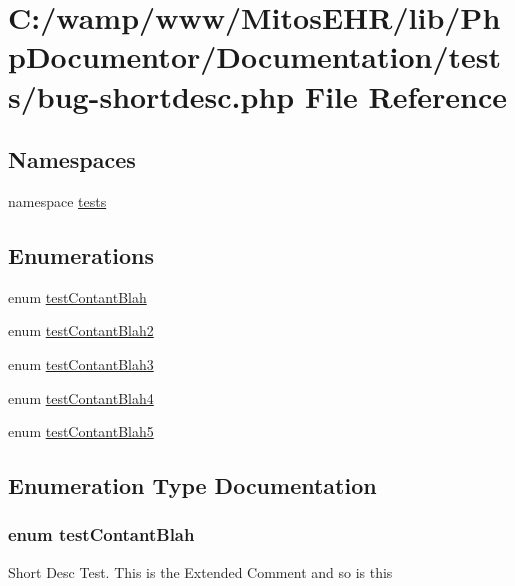 \hypertarget{bug-shortdesc_8php}{\section{\-C\-:/wamp/www/\-Mitos\-E\-H\-R/lib/\-Php\-Documentor/\-Documentation/tests/bug-\/shortdesc.php \-File \-Reference}
\label{bug-shortdesc_8php}
}
\subsection*{\-Namespaces}
\begin{DoxyCompactItemize}
\item 
namespace \hyperlink{namespacetests}{tests}
\end{DoxyCompactItemize}
\subsection*{\-Enumerations}
\begin{DoxyCompactItemize}
\item 
enum \hyperlink{bug-shortdesc_8php_ae5d714a0a108921625cb94fa6537c2e8}{test\-Contant\-Blah} 
\item 
enum \hyperlink{bug-shortdesc_8php_a7005da070457bc2f25107e37ef2bfe20}{test\-Contant\-Blah2} 
\item 
enum \hyperlink{bug-shortdesc_8php_a72cc93c42d31c42837326815765e0b34}{test\-Contant\-Blah3} 
\item 
enum \hyperlink{bug-shortdesc_8php_a8124928b8a202b0433a73ceae343a7ba}{test\-Contant\-Blah4} 
\item 
enum \hyperlink{bug-shortdesc_8php_a28fa4747f7cc27baf3749252fb8d5aa6}{test\-Contant\-Blah5} 
\end{DoxyCompactItemize}


\subsection{\-Enumeration \-Type \-Documentation}
\hypertarget{bug-shortdesc_8php_ae5d714a0a108921625cb94fa6537c2e8}{
\subsubsection[{test\-Contant\-Blah}]{\setlength{\rightskip}{0pt plus 5cm}enum {\bf test\-Contant\-Blah}}}\label{bug-shortdesc_8php_ae5d714a0a108921625cb94fa6537c2e8}
\-Short \-Desc \-Test. \-This is the \-Extended \-Comment and so is this 

